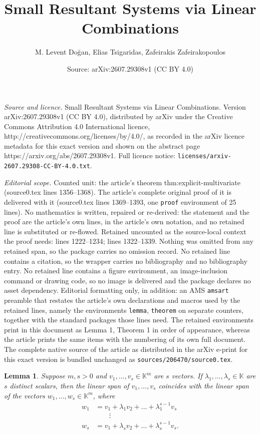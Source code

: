 \documentclass[10pt,a4paper]{amsart}
\title{Small Resultant Systems via Linear Combinations}
\author{M. Levent Do\u{g}an, Elias Tsigaridas, Zafeirakis Zafeirakopoulos}
\date{Source: arXiv:2607.29308v1 (CC BY 4.0)}
\newtheorem{lemma}{Lemma}
\newcommand{\KK}{\mathbb{K}}
\begin{document}
\maketitle

\noindent\emph{Source and licence.} Small Resultant Systems via Linear Combinations. Version arXiv:2607.29308v1 (CC BY 4.0), distributed by arXiv under the Creative Commons Attribution 4.0 International licence, http://creativecommons.org/licenses/by/4.0/, as recorded in the arXiv licence metadata for this exact version and shown on the abstract page https://arxiv.org/abs/2607.29308v1. Full licence notice: \texttt{licenses/arxiv-2607.29308-CC-BY-4.0.txt}.\par\smallskip

\noindent\textit{Editorial scope.} Counted unit: the article's theorem thm:explicit-multivariate (source0.tex lines 1356--1368). The article's complete original proof of it is delivered with it (source0.tex lines 1369--1393, one \texttt{proof} environment of 25 lines). No mathematics is written, repaired or re-derived: the statement and the proof are the article's own lines, in the article's own notation, and no retained line is substituted or re-flowed.  Retained uncounted as the source-local context the proof needs: lines 1222--1234; lines 1322--1339.  Nothing was omitted from any retained span, so the package carries no omission record.  No retained line contains a citation, so the wrapper carries no bibliography and no bibliography entry.  No retained line contains a figure environment, an image-inclusion command or drawing code, so no image is delivered and the package declares no asset dependency.  Editorial formatting only, in addition: an AMS \texttt{amsart} preamble that restates the article's own declarations and macros used by the retained lines, namely the environments \texttt{lemma}, \texttt{theorem} on separate counters, together with the standard packages those lines need.  The retained environments print in this document as Lemma 1, Theorem 1 in order of appearance, whereas the article prints the same items with the numbering of its own full document.  The complete native source of the article as distributed in the arXiv e-print for this exact version is bundled unchanged as \texttt{sources/206470/source0.tex}.
\begin{lemma}
\label{lem:vandermonde}
Suppose $m, s>0$ and $v_1,\dots,v_s\in\KK^m$ are $s$ vectors.
If $\lambda_1,\dots,\lambda_{s}\in\KK$ are $s$ distinct scalars, then the linear span of $v_1,\dots,v_s$ coincides with the linear span of the vectors
$w_1, \dots, w_s \in \KK^m$, where
 \[
\begin{split}
w_1 &= v_1 + \lambda_1 v_2 + \dots + \lambda_1^{s-1} v_s\\
& \qquad\vdots \\
w_s &= v_1 + \lambda_s v_2 + \dots + \lambda_s^{s-1} v_s.
\end{split}
\]
\end{lemma}
\end{document}
